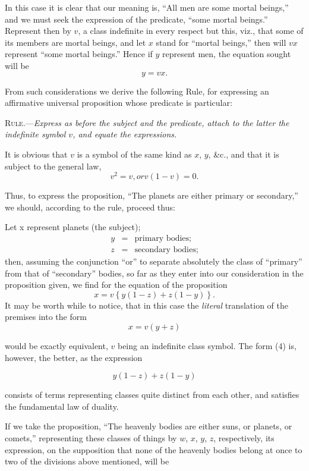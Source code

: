 \documentclass[oneside]{book}
\begin{document}
In this case it is clear that our meaning is, ``All men are
some mortal beings,'' and we must seek the expression of the
predicate, ``some mortal beings.'' Represent then by $v$, a class
indefinite in every respect but this, viz., that some of its members
are mortal beings, and let $x$ stand for ``mortal beings,'' then will
$vx$ represent ``some mortal beings.'' Hence if $y$ represent men,
the equation sought will be
\[
y = vx.
\]

From such considerations we derive the following Rule, for
expressing an affirmative universal proposition whose predicate
is particular:

\textsc{Rule}.---\textit{Express as before the subject and the predicate, attach
to the latter the indefinite symbol $v$, and equate the expressions.}

It is obvious that $v$ is a symbol of the same kind as $x$, $y$, \&c.,
and that it is subject to the general law,
\[
v^2 = v, or v (1 - v) = 0.
\]

Thus, to express the proposition, ``The planets are either
primary or secondary,'' we should, according to the rule, proceed
thus:

Let x represent planets (the subject);
\begin{eqnarray*}
y &=& \textrm{primary bodies;}\\
z &=& \textrm{secondary bodies;}
\end{eqnarray*}
then, assuming the conjunction ``or'' to separate absolutely the
class of ``primary'' from that of ``secondary'' bodies, so far as
they enter into our consideration in the proposition given, we
find for the equation of the proposition
\begin{equation}
x = v \left\{ y \left( 1 - z \right) + z \left( 1 - y \right) \right\}.
\end{equation}
It may be worth while to notice, that in this case the \textit{literal}
translation of the premises into the form
\begin{equation}
x = v (y + z)
\end{equation}

would be exactly equivalent, $v$ being an indefinite class symbol.
The form (4) is, however, the better, as the expression

\[
y \left( 1 - z \right) + z \left( 1 - y \right)
\]

consists of terms representing classes quite distinct from each
other, and satisfies the fundamental law of duality.

If we take the proposition, ``The heavenly bodies are either
suns, or planets, or comets,'' representing these classes of things
by $w$, $x$, $y$, $z$, respectively, its expression, on the supposition that
none of the heavenly bodies belong at once to two of the divisions
above mentioned, will be
\end{document}
